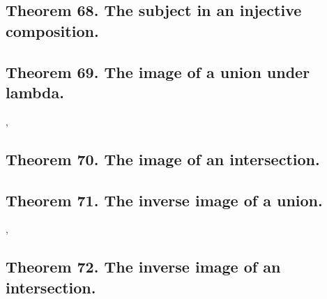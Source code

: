 \documentclass[preview]{standalone}
\begin{document}
\subsection[The subject function in an injective composition is injective.]
    {
        \color{section}Theorem 68. \color{black} The subject in an injective composition.
    }

\pagebreak


\subsection[The image of a union under the function lambda.]
    {
        \color{section}Theorem 69. \color{black} The image of a union under lambda.
    }

\sep


\subsection[The image of an intersection under lambda.]
    {
        \color{section}Theorem 70. \color{black} The image of an intersection.
    }

\pagebreak


\subsection[The inverse image of a union under lambda.]
    {
        \color{section}Theorem 71. \color{black} The inverse image of a union.
    }

\sep


\subsection[The inverse image of an intersection under lambda.]
    {
        \color{section}Theorem 72. \color{black} The inverse image of an intersection.
    }

\pagebreak
\end{document}
